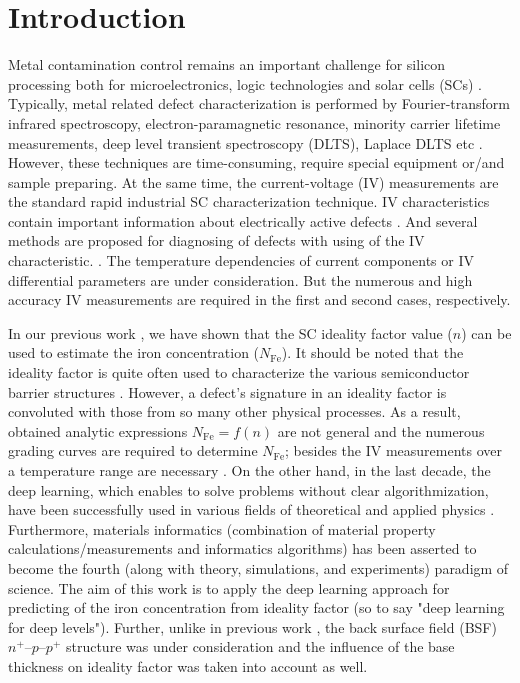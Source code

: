 \documentclass[num-refs]{wiley-article} %
\begin{document}
\section{Introduction}\label{sec:intro}
Metal  contamination control remains an important challenge for silicon processing both for microelectronics, logic technologies and solar cells (SCs) \cite{Claers2018,ZHU2016192,FeB:Schmidt,IronSC}.
Typically, metal related defect characterization is performed by Fourier-transform infrared spectroscopy,
electron-paramagnetic resonance,
minority carrier lifetime measurements,
deep level transient spectroscopy (DLTS),
Laplace DLTS etc \cite{Schroder2006,HowMuchPhysics,LaplDLTS}.
However, these techniques are time-consuming, require special equipment or/and sample preparing.
At the same time, the current-voltage (IV) measurements are the  standard  rapid industrial SC characterization technique.
IV characteristics contain important information about electrically active defects \cite{HowMuchPhysics,BulyarJAP}.
And several methods are proposed for diagnosing of defects with using of the IV characteristic.
\cite{HowMuchPhysics,BulyarJAP,BulyarSSE,Claeys2019,simoen2007}.
The temperature dependencies of current components \cite{Claeys2019,simoen2007}
or IV differential parameters \cite{BulyarJAP,BulyarSSE} are under consideration.
But the numerous and high accuracy IV measurements are required in the first and second cases, respectively.

In our previous work \cite{Olikh2019SM}, we have shown that the SC ideality factor value ($n$) can be used to estimate the iron concentration ($N_{\mathrm{Fe}}$).
It should be noted that the ideality factor is quite often  used to characterize the various
semiconductor barrier structures \cite{Heide,Duan,n_CharGaN,n_CharSemic,n_CharPhysRevAppl}.
However, a defect's signature in an ideality factor is convoluted with those from so many other physical processes.
As a result, obtained analytic expressions $N_{\mathrm{Fe}}=f(n)$ are not general and the numerous grading curves are required to determine $N_{\mathrm{Fe}}$;
besides the IV measurements over a temperature range are necessary \cite{Olikh2019SM}.
On the other hand, in the last decade, the deep learning, which enables to solve problems without clear algorithmization, have been successfully used in various fields of theoretical and applied physics \cite{MachLean_RevModPhys,MachLeanJAP,MachLeanPPV}.
Furthermore, materials informatics
(combination of material property calculations/measurements and informatics algorithms)
has been asserted \cite{MI_JAP} to become the fourth (along with theory, simulations, and experiments) paradigm of science.
The aim of this work is to apply the deep learning approach for predicting of the iron concentration from ideality factor
(so to say "deep learning for deep levels").
Further, unlike in previous work \cite{Olikh2019SM}, the back surface field (BSF) $n^+$--$p$--$p^+$ structure was under consideration
and the influence of the base thickness on ideality factor was taken into account as well.
\end{document}
